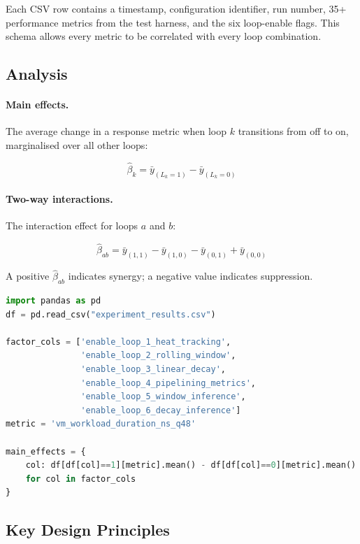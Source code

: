 Each CSV row contains a timestamp, configuration identifier, run number,
35+ performance metrics from the test harness, and the six loop-enable flags.
This schema allows every metric to be correlated with every loop combination.

\subsection{Analysis}

\paragraph{Main effects.}
The average change in a response metric when loop $k$ transitions from off to on,
marginalised over all other loops:

\begin{equation}
  \hat{\beta}_k = \bar{y}_{(L_k=1)} - \bar{y}_{(L_k=0)}
\end{equation}

\paragraph{Two-way interactions.}
The interaction effect for loops $a$ and $b$:

\begin{equation}
  \hat{\beta}_{ab} = \bar{y}_{(1,1)} - \bar{y}_{(1,0)} - \bar{y}_{(0,1)} + \bar{y}_{(0,0)}
\end{equation}

A positive $\hat{\beta}_{ab}$ indicates synergy; a negative value indicates
suppression.

\begin{lstlisting}[language=Python]
import pandas as pd
df = pd.read_csv("experiment_results.csv")

factor_cols = ['enable_loop_1_heat_tracking',
               'enable_loop_2_rolling_window',
               'enable_loop_3_linear_decay',
               'enable_loop_4_pipelining_metrics',
               'enable_loop_5_window_inference',
               'enable_loop_6_decay_inference']
metric = 'vm_workload_duration_ns_q48'

main_effects = {
    col: df[df[col]==1][metric].mean() - df[df[col]==0][metric].mean()
    for col in factor_cols
}
\end{lstlisting}


\subsection{Key Design Principles}


